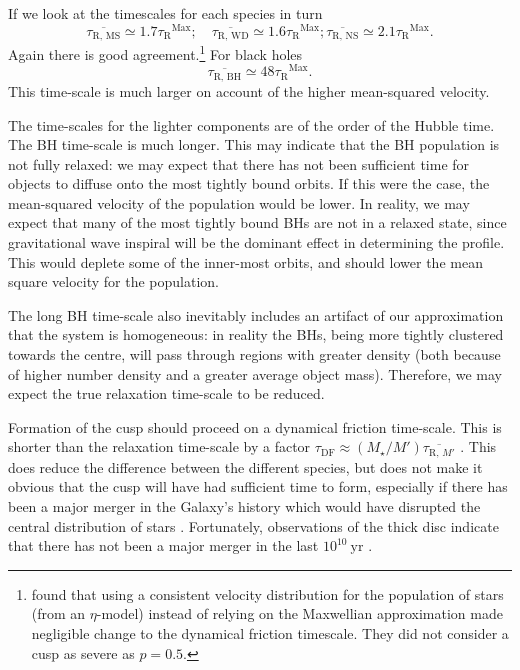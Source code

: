 \documentclass[useAMS,usedcolumn,usegraphicx,usenatbib]{mn2e}
\newcommand{\units}[1]{\ensuremath{~\mathrm{#1}}}
\newcommand{\sub}[1]{\ensuremath{_\mathrm{#1}}}
\newcommand{\super}[1]{\ensuremath{^\mathrm{#1}}}
\begin{document}
\begin{onecolumn}
If we look at the timescales for each species in turn
\begin{equation}
\overline{\tau\sub{R,\,MS}} \simeq 1.7 \tau\sub{R}\super{Max};\quad \overline{\tau\sub{R,\,WD}} \simeq 1.6 \tau\sub{R}\super{Max}; \overline{\tau\sub{R,\,NS}} \simeq 2.1 \tau\sub{R}\super{Max}.
\end{equation}
Again there is good agreement.\footnote{\citet*{Freitag2006} found that using a consistent velocity distribution for the population of stars (from an $\eta$-model) instead of relying on the Maxwellian approximation made negligible change to the dynamical friction timescale. They did not consider a cusp as severe as $p = 0.5$.} For black holes
\begin{equation}
\overline{\tau\sub{R,\,BH}} \simeq 48 \tau\sub{R}\super{Max}.
\end{equation}
This time-scale is much larger on account of the higher mean-squared velocity.

The time-scales for the lighter components are of the order of the Hubble time. The BH time-scale is much longer. This may indicate that the BH population is not fully relaxed: we may expect that there has not been sufficient time for objects to diffuse onto the most tightly bound orbits. If this were the case, the mean-squared velocity of the population would be lower. In reality, we may expect that many of the most tightly bound BHs are not in a relaxed state, since gravitational wave inspiral will be the dominant effect in determining the profile. This would deplete some of the inner-most orbits, and should lower the mean square velocity for the population.

The long BH time-scale also inevitably includes an artifact of our approximation that the system is homogeneous: in reality the BHs, being more tightly clustered towards the centre, will pass through regions with greater density (both because of higher number density and a greater average object mass). Therefore, we may expect the true relaxation time-scale to be reduced.

Formation of the cusp should proceed on a dynamical friction time-scale. This is shorter than the relaxation time-scale by a factor $\tau\sub{DF} \approx (M_\star/M')\overline{\tau_{\mathrm{R},\,M'}}$ \citep[section 3.4]{Spitzer1987}. This does reduce the difference between the different species, but does not make it obvious that the cusp will have had sufficient time to form, especially if there has been a major merger in the Galaxy's history which would have disrupted the central distribution of stars \citep{Gualandris2012}. Fortunately, observations of the thick disc indicate that there has not been a major merger in the last $10^{10}\units{yr}$ \citep{Wyse2008}.


\end{onecolumn}
\end{document}

